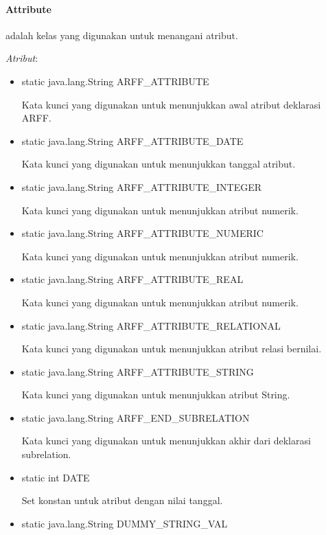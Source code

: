 \paragraph{Attribute} adalah kelas yang digunakan untuk menangani atribut.

\textsl{Atribut}:
\begin{itemize}
	\item static java.lang.String ARFF\_ATTRIBUTE
	
	Kata kunci yang digunakan untuk menunjukkan awal atribut deklarasi ARFF.
	
	\item static java.lang.String ARFF\_ATTRIBUTE\_DATE
	
	Kata kunci yang digunakan untuk menunjukkan tanggal atribut.
	
	\item static java.lang.String ARFF\_ATTRIBUTE\_INTEGER
	
	Kata kunci yang digunakan untuk menunjukkan atribut numerik.
	
	\item static java.lang.String ARFF\_ATTRIBUTE\_NUMERIC
	
	Kata kunci yang digunakan untuk menunjukkan atribut numerik.
	
	\item static java.lang.String ARFF\_ATTRIBUTE\_REAL
	
	Kata kunci yang digunakan untuk menunjukkan atribut numerik.
	
	\item static java.lang.String ARFF\_ATTRIBUTE\_RELATIONAL
	
	Kata kunci yang digunakan untuk menunjukkan atribut relasi bernilai.
	
	\item static java.lang.String ARFF\_ATTRIBUTE\_STRING
	
	Kata kunci yang digunakan untuk menunjukkan atribut String.
	
	\item static java.lang.String ARFF\_END\_SUBRELATION
	
	Kata kunci yang digunakan untuk menunjukkan akhir dari deklarasi subrelation.
	
	\item static int DATE
	
	Set konstan untuk atribut dengan nilai tanggal.
	
	\item static java.lang.String DUMMY\_STRING\_VAL
	

\end{itemize}
